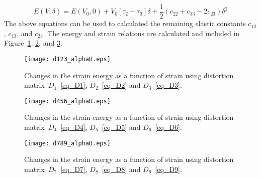 \begin{equation}
E(V,\delta) = E(V_0, 0) + V_0\left [ \tau_2 - \tau_3 \right ] \delta + \frac{1}{2} \left(c_{22} + c_{33} -2c_{23}  \right)\delta^2
\end{equation}
The above equations can be used to calculated the remaining elastic constants $c_{12}$, $c_{13}$, and $c_{23}$. The energy and strain relations are calculated and included in Figure~\ref{fig_D123}, \ref{fig_D456}, and \ref{fig_D789}. 

\begin{figure}
	\centering
	\texttt{[image: d123\_alphaU.eps]}
	\caption[Changes in strain energy in $D_1$, $D_2$ and $D_3$]{Changes in the strain energy as a function of strain using distortion matrix~$D_1$~\eqref{eq_D1}, $D_2$~\eqref{eq_D2} and $D_3$~\eqref{eq_D3}.}
	\label{fig_D123}
\end{figure}

\begin{figure}
	\centering
	\texttt{[image: d456\_alphaU.eps]}
	\caption[Changes in strain energy in $D_4$, $D_5$ and $D_6$]{Changes in the strain energy as a function of strain using distortion matrix~$D_4$~\eqref{eq_D4}, $D_5$~\eqref{eq_D5} and $D_6$~\eqref{eq_D6}.}
	\label{fig_D456}
\end{figure}

\begin{figure}
	\centering
	\texttt{[image: d789\_alphaU.eps]}
	\caption[Changes in strain energy in $D_7$, $D_8$ and $D_9$]{Changes in the strain energy as a function of strain using distortion matrix~$D_7$~\eqref{eq_D7}, $D_8$~\eqref{eq_D8} and $D_9$~\eqref{eq_D9}.}
	\label{fig_D789}
\end{figure}





